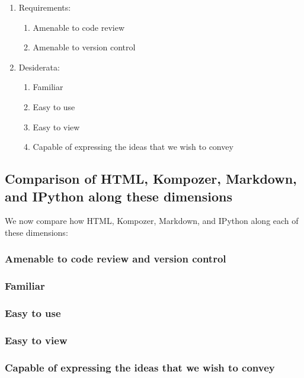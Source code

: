\documentclass[]{article}
\begin{document}
\begin{enumerate}
	\item Requirements:
		\begin{enumerate}
			\item Amenable to code review
			\item Amenable to version control
		\end{enumerate}
	\item Desiderata:
		\begin{enumerate}
			\item Familiar
			\item Easy to use
			\item Easy to view
			\item Capable of expressing the ideas that we wish to convey
			
		\end{enumerate}
\end{enumerate}

\subsection{Comparison of HTML, Kompozer, Markdown, and IPython along these dimensions}

We now compare how HTML, Kompozer, Markdown, and IPython along each of these dimensions:

	\subsubsection{Amenable to code review and version control}
	
		
	
	\subsubsection{Familiar}
	
	\subsubsection{Easy to use}
	
	\subsubsection{Easy to view}
	
	\subsubsection{Capable of expressing the ideas that we wish to convey}
\end{document}
